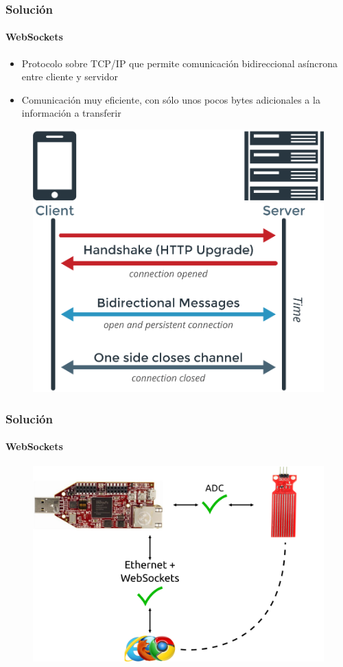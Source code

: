 \documentclass[compress]{beamer}
\begin{document}
		\begin{frame}
			\frametitle{Soluci\'on}
			\framesubtitle{WebSockets}
				\begin{itemize}
					\item
					{

						Protocolo sobre TCP/IP que permite comunicaci\'on bidireccional as\'incrona entre cliente y servidor

					}
					\item
					{

						Comunicaci\'on muy eficiente, con s\'olo unos pocos bytes adicionales a la informaci\'on a transferir

					}
				\end{itemize}
				\begin{figure}
					\includegraphics[keepaspectratio = true, totalheight=0.5\textheight]{figuras/ws_diagrama.png}
				\end{figure}
 		\end{frame}
		\begin{frame}
			\frametitle{Soluci\'on}
			\framesubtitle{WebSockets}
				\begin{figure}
					\includegraphics[keepaspectratio = true, totalheight=0.6\textheight]{figuras/adc_web_ok.png}
				\end{figure}
 		\end{frame}
\end{document}
